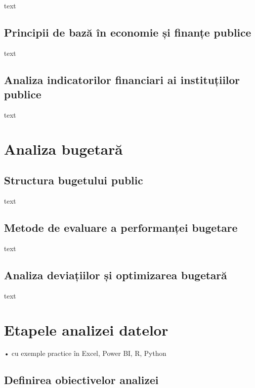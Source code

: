 \documentclass[
  11pt,
  b5paper,
  nottoc]{book}
\begin{document}
text

\section{Principii de bază în economie și finanțe
publice}\label{principii-de-bazux103-uxeen-economie-ux219i-finanux21be-publice}

text

\section{Analiza indicatorilor financiari ai instituțiilor
publice}\label{analiza-indicatorilor-financiari-ai-instituux21biilor-publice}

text


\chapter{Analiza bugetară}\label{cap4}

\section{Structura bugetului public}\label{structura-bugetului-public}

text

\section{Metode de evaluare a performanței
bugetare}\label{metode-de-evaluare-a-performanux21bei-bugetare}

text

\section{Analiza deviațiilor și optimizarea
bugetară}\label{analiza-deviaux21biilor-ux219i-optimizarea-bugetarux103}

text


\chapter{Etapele analizei datelor}\label{cap5}

• cu exemple practice în Excel, Power BI, R, Python

\section{Definirea obiectivelor
analizei}\label{definirea-obiectivelor-analizei}
\end{document}
